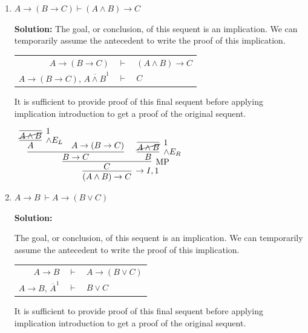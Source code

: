 \documentclass[11pt]{report}
\newcommand{\temp}[2]{{\overline{#2}}^{#1}}
\begin{document}
\begin{enumerate}
\begin{enumerate}
		\item $A \rightarrow ( B \rightarrow  C) \vdash (A \land B) \rightarrow C$
		
		\textbf{Solution:}
		The goal, or conclusion, of this sequent is an implication. We can temporarily assume the antecedent to write the proof of this implication. 

		\begin{center}
			\begin{tabular}{r c l}
				$A \rightarrow ( B \rightarrow  C)$ & $\vdash$ & $(A \land B) \rightarrow C$ \\
				$A \rightarrow ( B \rightarrow  C)$, $\temp{1}{A \land B}$ & $\vdash$ & $C$ \\				
			\end{tabular}
		\end{center}

		It is sufficient to provide proof of this final sequent before applying implication introduction to get a proof of the original sequent.

			\begin{center}
				$\begin{array}{c}
					\infer[\to I,1]{(A \land B) \to C}
						{\infer[\MP]{C}
							{\infer[]{B\to C}
								{\infer[\land E_{L}]{A}{\infer[1]{\cancel{A \land B}}{}} & A \to (B \to C)}
							&
							\infer[\land E_{R}]{B}
								{\infer[1]{\cancel{A \land B}}{}}}}
				\end{array}$
			\end{center}

		\item $A \to B \ \vdash A \to (B \lor C)$
		
		\textbf{Solution:}
		
		The goal, or conclusion, of this sequent is an implication. We can temporarily assume the antecedent to write the proof of this implication. 

		\begin{center}
			\begin{tabular}{r c l}
				$A \rightarrow  B$ & $\vdash$ & $A \to (B \lor C)$ \\
				$A \rightarrow  B$, $\temp{1}{A}$ & $\vdash$ & $B \lor C$ \\				
			\end{tabular}
		\end{center}

		It is sufficient to provide proof of this final sequent before applying implication introduction to get a proof of the original sequent.


\end{enumerate}
\end{enumerate}
\end{document}
